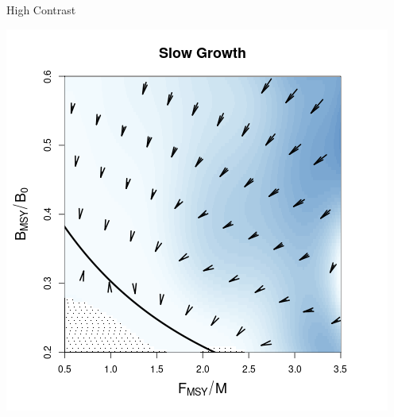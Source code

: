 \documentclass[ xcolor = pdftex, dvipsnames, table ]{beamer}
\begin{document}
\begin{frame}{High Contrast}
\begin{minipage}[h!]{0.47\textwidth}
	\includegraphics[height=0.28\textheight]{../../ddBias/directionalBiasDDSubExpT45N150A0-1AS2K0.1Blues.png} %
	\end{minipage}
\end{frame}
\end{document}
